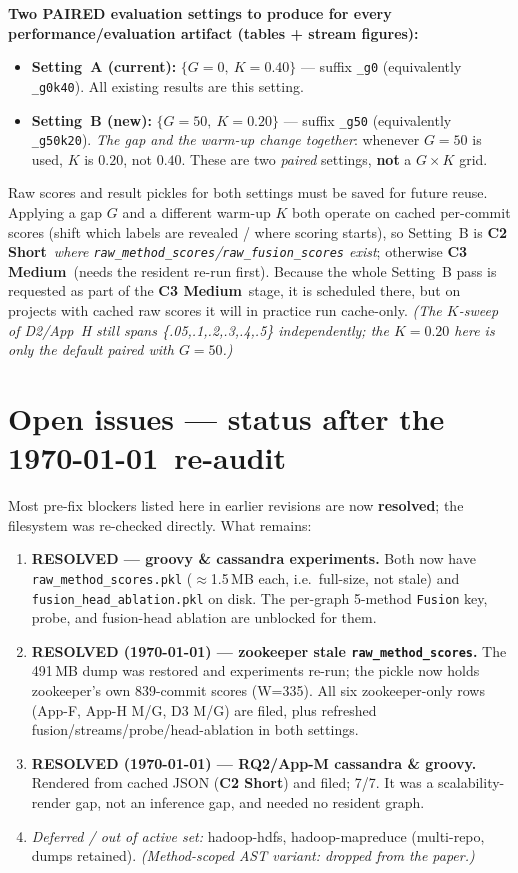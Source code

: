 \documentclass[10pt]{article}
\providecommand{\code}[1]{\texttt{\small #1}}
\newcommand{\Ctwo}{\textcolor{blue!65!black}{\textbf{C2 Short}}}
\newcommand{\Cthree}{\textcolor{orange!85!black}{\textbf{C3 Medium}}}
\begin{document}
\textbf{Two PAIRED evaluation settings to produce for every performance/evaluation
artifact (tables + stream figures):}
\begin{itemize}[leftmargin=1.5em,itemsep=1pt]
  \item \textbf{Setting~A (current):} $\{G\!=\!0,\ K\!=\!0.40\}$ --- suffix \code{\_g0}
  (equivalently \code{\_g0k40}). All existing results are this setting.
  \item \textbf{Setting~B (new):} $\{G\!=\!50,\ K\!=\!0.20\}$ --- suffix \code{\_g50}
  (equivalently \code{\_g50k20}). \emph{The gap and the warm-up change together}: whenever
  $G\!=\!50$ is used, $K$ is $0.20$, not $0.40$. These are two \emph{paired} settings,
  \textbf{not} a $G\times K$ grid.
\end{itemize}
Raw scores and result pickles for both settings must be saved for future reuse.
Applying a gap $G$ and a different warm-up $K$ both operate on cached per-commit scores
(shift which labels are revealed / where scoring starts), so Setting~B is \Ctwo\
\emph{where \code{raw\_method\_scores}/\code{raw\_fusion\_scores} exist}; otherwise
\Cthree\ (needs the resident re-run first). Because the whole Setting~B pass is
requested as part of the \Cthree\ stage, it is scheduled there, but on projects with
cached raw scores it will in practice run cache-only. \emph{(The $K$-sweep of D2/App~H
still spans \{.05,.1,.2,.3,.4,.5\} independently; the $K\!=\!0.20$ here is only the
default paired with $G\!=\!50$.)}

\section*{Open issues --- status after the \today\ re-audit}
Most pre-fix blockers listed here in earlier revisions are now \textbf{resolved}; the
filesystem was re-checked directly. What remains:
\begin{enumerate}[leftmargin=1.6em,itemsep=1pt]
  \item \textbf{RESOLVED --- groovy \& cassandra experiments.} Both now have
  \code{raw\_method\_scores.pkl} ($\approx$1.5\,MB each, i.e.\ full-size, not stale) and
  \code{fusion\_head\_ablation.pkl} on disk. The per-graph 5-method \code{Fusion} key,
  probe, and fusion-head ablation are unblocked for them.
  \item \textbf{RESOLVED (\today) --- zookeeper stale \code{raw\_method\_scores}.} The
  491\,MB dump was restored and experiments re-run; the pickle now holds zookeeper's
  own 839-commit scores (W=335). All six zookeeper-only rows (App-F, App-H M/G, D3 M/G)
  are filed, plus refreshed fusion/streams/probe/head-ablation in both settings.
  \item \textbf{RESOLVED (\today) --- RQ2/App-M cassandra \& groovy.} Rendered from
  cached JSON (\Ctwo) and filed; 7/7. It was a scalability-render gap, not an inference
  gap, and needed no resident graph.
  \item \emph{Deferred / out of active set:} hadoop-hdfs, hadoop-mapreduce (multi-repo,
  dumps retained). \emph{(Method-scoped AST variant: dropped from the paper.)}
\end{enumerate}
\end{document}
